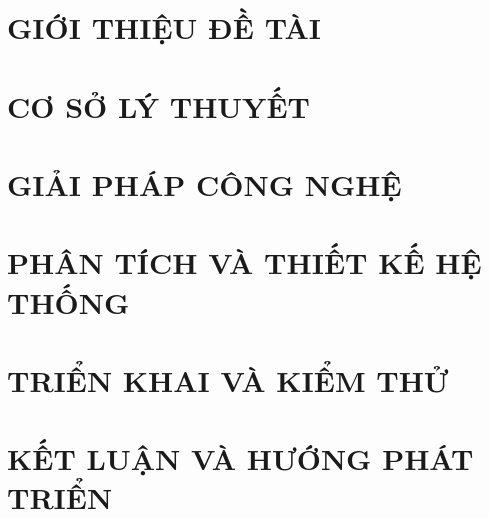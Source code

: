 \documentclass[a4paper,twoside]{report}
\renewcommand{\bibname}{Danh_sach_tai_lieu_tham_khao}
\theoremstyle{definition}
\begin{document}
\newpage


\newpage



\newpage
{}

\pagestyle{fancy}
\fancyhf{}
\fancyhead[RE, LO]{\leftmark}
\fancyfoot[RE, LO]{\thepage}

\chapter{GIỚI THIỆU ĐỀ TÀI}
\label{chapter:Introduction}

\newpage
\chapter{CƠ SỞ LÝ THUYẾT}
\label{chapter:Related_works}



\newpage
\chapter{GIẢI PHÁP CÔNG NGHỆ}
\label{chapter:Methodology}


\newpage
\chapter{PHÂN TÍCH VÀ THIẾT KẾ HỆ THỐNG}
\label{chapter:Experiment}


\newpage
\chapter{TRIỂN KHAI VÀ KIỂM THỬ}
\label{chapter:SolutionAndContribution}

\newpage
{}
\chapter*{KẾT LUẬN VÀ HƯỚNG PHÁT TRIỂN}
\label{chapter:KetLuan}



\newpage
\renewcommand\bibname{TÀI LIỆU THAM KHẢO}
\printbibliography
{}
\end{document}
